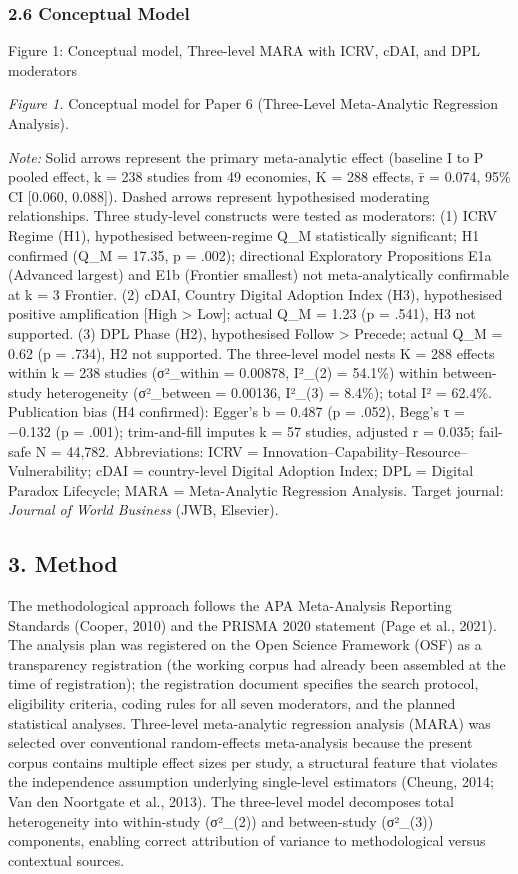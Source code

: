 \documentclass[
  12pt,a4paper]{article}
\begin{document}
\hypertarget{conceptual-model}{%
\subsubsection{2.6 Conceptual Model}\label{conceptual-model}}

Figure 1: Conceptual model, Three-level MARA with ICRV, cDAI, and DPL
moderators

\emph{Figure 1.} Conceptual model for Paper 6 (Three-Level Meta-Analytic
Regression Analysis).

\emph{Note:} Solid arrows represent the primary meta-analytic effect
(baseline I to P pooled effect, k = 238 studies from 49 economies, K =
288 effects, r̄ = 0.074, 95\% CI {[}0.060, 0.088{]}). Dashed arrows
represent hypothesised moderating relationships. Three study-level
constructs were tested as moderators: (1) ICRV Regime (H1), hypothesised
between-regime Q\_M statistically significant; H1 confirmed (Q\_M =
17.35, p = .002); directional Exploratory Propositions E1a (Advanced
largest) and E1b (Frontier smallest) not meta-analytically confirmable
at k = 3 Frontier. (2) cDAI, Country Digital Adoption Index (H3),
hypothesised positive amplification {[}High \textgreater{} Low{]};
actual Q\_M = 1.23 (p = .541), H3 not supported. (3) DPL Phase (H2),
hypothesised Follow \textgreater{} Precede; actual Q\_M = 0.62 (p =
.734), H2 not supported. The three-level model nests K = 288 effects
within k = 238 studies (σ²\_within = 0.00878, I²\_(2) = 54.1\%) within
between-study heterogeneity (σ²\_between = 0.00136, I²\_(3) = 8.4\%);
total I² = 62.4\%. Publication bias (H4 confirmed): Egger's b = 0.487 (p
= .052), Begg's τ = −0.132 (p = .001); trim-and-fill imputes k = 57
studies, adjusted r = 0.035; fail-safe N = 44,782. Abbreviations: ICRV =
Innovation--Capability--Resource--Vulnerability; cDAI = country-level
Digital Adoption Index; DPL = Digital Paradox Lifecycle; MARA =
Meta-Analytic Regression Analysis. Target journal: \emph{Journal of
World Business} (JWB, Elsevier).

\hypertarget{method}{%
\subsection{3. Method}\label{method}}

The methodological approach follows the APA Meta-Analysis Reporting
Standards (Cooper, 2010) and the PRISMA 2020 statement (Page et al.,
2021). The analysis plan was registered on the Open Science Framework
(OSF) as a transparency registration (the working corpus had already
been assembled at the time of registration); the registration document
specifies the search protocol, eligibility criteria, coding rules for
all seven moderators, and the planned statistical analyses. Three-level
meta-analytic regression analysis (MARA) was selected over conventional
random-effects meta-analysis because the present corpus contains
multiple effect sizes per study, a structural feature that violates the
independence assumption underlying single-level estimators (Cheung,
2014; Van den Noortgate et al., 2013). The three-level model decomposes
total heterogeneity into within-study (σ²\_(2)) and between-study
(σ²\_(3)) components, enabling correct attribution of variance to
methodological versus contextual sources.
\end{document}

